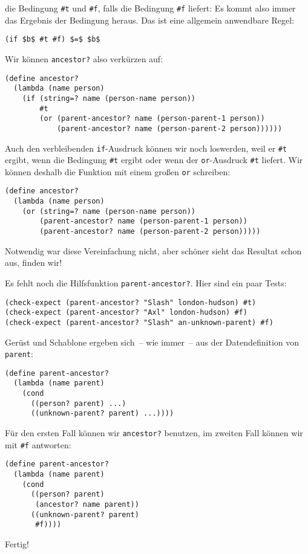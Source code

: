 die Bedingung \lstinline{#t} und \lstinline{#f}, falls die Bedingung
\lstinline{#f} liefert: Es kommt also immer das Ergebnis der Bedingung
heraus.  Das ist eine allgemein anwendbare Regel:
%
\begin{lstlisting}
(if $b$ #t #f) $=$ $b$
\end{lstlisting}
%
Wir können \lstinline{ancestor?} also verkürzen auf:
%
\begin{lstlisting}
(define ancestor?
  (lambda (name person)
    (if (string=? name (person-name person))
        #t
        (or (parent-ancestor? name (person-parent-1 person))
            (parent-ancestor? name (person-parent-2 person))))))
\end{lstlisting}
%
Auch den verbleibenden \lstinline{if}-Ausdruck können wir noch
loswerden, weil er \lstinline{#t} ergibt, wenn die Bedingung
\lstinline{#t} ergibt oder wenn der \lstinline{or}-Ausdruck
\lstinline{#t} liefert.  Wir können deshalb die Funktion mit einem
großen \lstinline{or} schreiben:
%
\begin{lstlisting}
(define ancestor?
  (lambda (name person)
    (or (string=? name (person-name person))
        (parent-ancestor? name (person-parent-1 person))
        (parent-ancestor? name (person-parent-2 person)))))
\end{lstlisting}
%
Notwendig war diese Vereinfachung nicht, aber schöner sieht das
Resultat schon aus, finden wir!

Es fehlt noch die Hilfsfunktion \lstinline{parent-ancestor?}.  Hier
sind ein paar Tests:
%
\begin{lstlisting}
(check-expect (parent-ancestor? "Slash" london-hudson) #t)
(check-expect (parent-ancestor? "Axl" london-hudson) #f)
(check-expect (parent-ancestor? "Slash" an-unknown-parent) #f)
\end{lstlisting}
%
Gerüst und Schablone ergeben sich~-- wie immer~-- aus der
Datendefinition von \lstinline{parent}:
%
\begin{lstlisting}
(define parent-ancestor?
  (lambda (name parent)
    (cond
      ((person? parent) ...)
      ((unknown-parent? parent) ...))))
\end{lstlisting}
%
Für den ersten Fall können wir \lstinline{ancestor?} benutzen, im
zweiten Fall können wir mit \lstinline{#f} antworten:
%
\begin{lstlisting}
(define parent-ancestor?
  (lambda (name parent)
    (cond
      ((person? parent)
       (ancestor? name parent))
      ((unknown-parent? parent)
       #f))))
\end{lstlisting}
%
Fertig!

